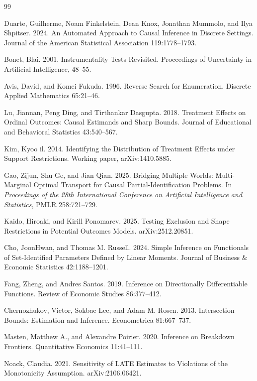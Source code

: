 \documentclass{article}
\begin{document}
\begin{thebibliography}{99}

   Duarte, Guilherme, Noam Finkelstein, Dean Knox, Jonathan Mummolo, and Ilya Shpitser. 2024. An Automated Approach to Causal Inference in Discrete Settings. Journal of the American Statistical Association 119:1778--1793.

   Bonet, Blai. 2001. Instrumentality Tests Revisited. Proceedings of Uncertainty in Artificial Intelligence, 48--55.

   Avis, David, and Komei Fukuda. 1996. Reverse Search for Enumeration. Discrete Applied Mathematics 65:21--46.

   Lu, Jiannan, Peng Ding, and Tirthankar Dasgupta. 2018. Treatment Effects on Ordinal Outcomes: Causal Estimands and Sharp Bounds. Journal of Educational and Behavioral Statistics 43:540--567.

   Kim, Kyoo il. 2014. Identifying the Distribution of Treatment Effects under Support Restrictions. Working paper, arXiv:1410.5885.

   Gao, Zijun, Shu Ge, and Jian Qian. 2025. Bridging Multiple Worlds: Multi-Marginal Optimal Transport for Causal Partial-Identification Problems. In \emph{Proceedings of the 28th International Conference on Artificial Intelligence and Statistics}, PMLR 258:721--729.

   Kaido, Hiroaki, and Kirill Ponomarev. 2025. Testing Exclusion and Shape Restrictions in Potential Outcomes Models. arXiv:2512.20851.

   Cho, JoonHwan, and Thomas M. Russell. 2024. Simple Inference on Functionals of Set-Identified Parameters Defined by Linear Moments. Journal of Business \& Economic Statistics 42:1188--1201.

   Fang, Zheng, and Andres Santos. 2019. Inference on Directionally Differentiable Functions. Review of Economic Studies 86:377--412.

   Chernozhukov, Victor, Sokbae Lee, and Adam M. Rosen. 2013. Intersection Bounds: Estimation and Inference. Econometrica 81:667--737.

   Masten, Matthew A., and Alexandre Poirier. 2020. Inference on Breakdown Frontiers. Quantitative Economics 11:41--111.

   Noack, Claudia. 2021. Sensitivity of LATE Estimates to Violations of the Monotonicity Assumption. arXiv:2106.06421.


\end{thebibliography}
\end{document}
